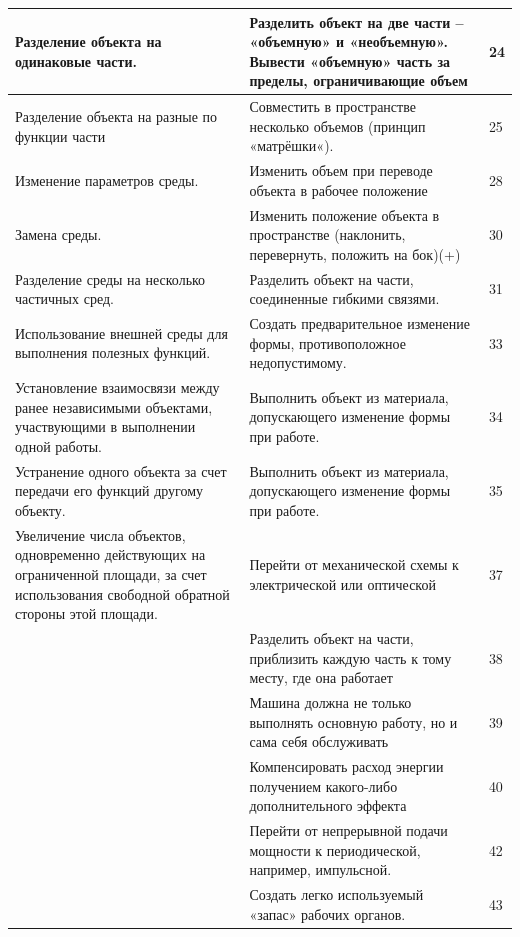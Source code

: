 \documentclass[11pt,a4paper]{article}
\begin{document}
\begin{center}
  \begin{tabular}{|p{}|p{}|p{}|}\hline
Разделение объекта на одинаковые части. & Разделить объект на две части --
«объемную» и «необъемную». Вывести «объемную» часть за пределы, ограничивающие
объем & 24\\\hline
Разделение объекта на разные по функции части & Совместить в пространстве
несколько объемов (принцип «матрёшки«). & 25\\\hline
Изменение параметров среды. & Изменить объем при переводе объекта в рабочее
положение & 28\\\hline
Замена среды. & Изменить положение объекта в пространстве (наклонить,
перевернуть, положить на бок)(+) & 30\\\hline
Разделение среды на несколько частичных сред. & Разделить объект на части,
соединенные гибкими связями. & 31\\\hline
Использование внешней среды для выполнения полезных функций. & Создать
предварительное изменение формы, противоположное недопустимому. & 33\\\hline
Установление взаимосвязи между ранее независимыми объектами, участвующими в
выполнении одной работы. & Выполнить объект из материала, допускающего
изменение формы при работе. & 34\\\hline
Устранение одного объекта за счет передачи его функций другому объекту. &
Выполнить объект из материала, допускающего изменение формы при работе. &
35\\\hline
Увеличение числа объектов, одновременно действующих на ограниченной площади,
за счет использования свободной обратной стороны этой площади. & Перейти от
механической схемы к электрической или оптической & 37\\\hline
&Разделить объект на части, приблизить каждую часть к тому месту, где она
работает &38\\\hline
&Машина должна не только выполнять основную работу, но и сама себя
обслуживать &39\\\hline
&Компенсировать расход энергии получением какого-либо дополнительного эффекта
&40\\\hline
&Перейти от непрерывной подачи мощности к периодической, например, импульсной.
&42\\\hline
&Создать легко используемый «запас» рабочих органов. & 43\\\hline
  \end{tabular}


\end{center}
\end{document}
